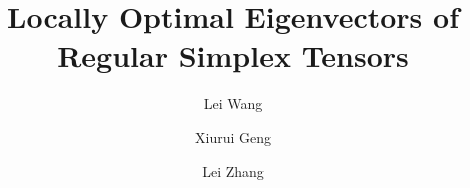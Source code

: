 \documentclass{elsarticle}
\begin{document}
	
	\title{
		Locally  Optimal   Eigenvectors of  Regular  Simplex Tensors
	}
	
	\author[add1]{Lei  Wang}
	\author[add2,add3,add4]{Xiurui Geng}
		\author[add1]{Lei  Zhang}

	
	

		\address[add1]{	the School of Microelectronics and Communication
	Engineering, Chongqing University, Chongqing 400044, China}
	\address[add2]{Aerospace Information Research Institute, Chinese Academy of Sciences, Beijing 100094, China}
	\address[add3]{University of the Chinese Academy of Sciences, Beijing 100049, China} 
	\address[add4]{Key Laboratory of  Technology in Geo-Spatial Information Processing and Application System, Chinese Academy of Science, Beijing 100190, China}


%
%
%
%


	
\end{document}
